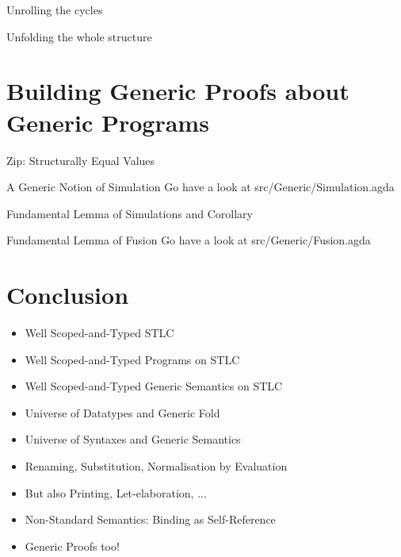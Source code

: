 \documentclass{beamer}
\begin{document}
\begin{frame}{Unrolling the cycles}
\end{frame}

\begin{frame}{Unfolding the whole structure}
\end{frame}

\section{Building Generic Proofs about Generic Programs}

\begin{frame}{Zip: Structurally Equal Values}
 \hspace{-50pt}\begin{minipage}{0.9\textwidth}
 \end{minipage}
\end{frame}

\begin{frame}{A Generic Notion of Simulation}
  Go have a look at src/Generic/Simulation.agda
\end{frame}

\begin{frame}{Fundamental Lemma of Simulations and Corollary}
 \hspace{-50pt}\begin{minipage}{0.9\textwidth}
 \end{minipage}
\end{frame}

\begin{frame}{Fundamental Lemma of Fusion}
  Go have a look at src/Generic/Fusion.agda
\end{frame}

\section{Conclusion}

\begin{frame}
  \begin{itemize}
    \item Well Scoped-and-Typed STLC
    \item Well Scoped-and-Typed Programs on STLC
    \item Well Scoped-and-Typed Generic Semantics on STLC
    \item Universe of Datatypes and Generic Fold
    \item Universe of Syntaxes and Generic Semantics
    \item Renaming, Substitution, Normalisation by Evaluation
    \item But also Printing, Let-elaboration, ...
    \item Non-Standard Semantics: Binding as Self-Reference
    \item Generic Proofs too!
  \end{itemize}
\end{frame}
\end{document}
